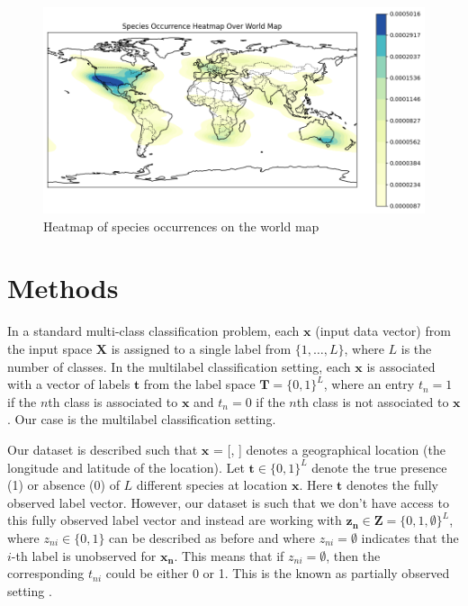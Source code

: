 \documentclass{article}
\begin{document}
\begin{figure}[H]
    \centering
    \includegraphics[width=1\linewidth, height=0.25\textheight]{heatmap_world_map.png}
    \caption{Heatmap of species occurrences on the world map}
    \label{fig:worldheatmap}
\end{figure}


\section{Methods}
In a standard multi-class classification problem, each $\mathbf{x}$ (input data vector) from the input space $\mathbf{X}$ is assigned to a single label from $\{1, \ldots, L\}$, where $L$ is the number of classes. In the multilabel classification setting, each $\mathbf{x}$ is associated with a vector of labels $\mathbf{t}$ from the label space $\mathbf{T} = \{0, 1\}^L$, where an entry $t_{n} = 1$ if the $n$th class is associated to $\mathbf{x}$ and $t_{n} = 0$ if the $n$th class is not associated to $\mathbf{x}$ \cite{cole2021multilabel}. Our case is the multilabel classification setting. 

Our dataset is described such that $\mathbf{x}$ = [, ] denotes a geographical location (the longitude and latitude of the location). Let $\mathbf{t} \in \{0, 1\}^L$ denote the true presence (1) or absence (0) of $L$ different species at location $\mathbf{x}$. Here 
$\mathbf{t}$ denotes the fully observed label vector. However, our dataset is such that we don't have access to this fully observed label vector and instead are working with $\mathbf{z_{n}} \in \mathcal{\mathbf{Z}} = \{0, 1, \emptyset\}^L$, where $z_{ni} \in \{0, 1\}$ can be described as before and where $z_{ni} = \emptyset$ indicates that the $i$-th label is unobserved for $\mathbf{x_n}$. This means that if $z_{ni} = \emptyset$, then the corresponding $t_{ni}$ could be either 0 or 1. This is the known as partially observed setting \cite{spatial,cole2021multilabel}.
\end{document}
